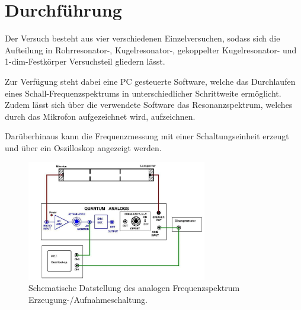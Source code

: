 \newpage
\section{Durchführung}
Der Versuch besteht aus vier verschiedenen Einzelversuchen, sodass sich die Aufteilung
in Rohrresonator-, Kugelresonator-, gekoppelter Kugelresonator- und 1-dim-Festkörper Versuchsteil gliedern lässt.

Zur Verfügung steht dabei eine PC gesteuerte Software, welche das Durchlaufen eines Schall-Frequenzspektrums 
in unterschiedlicher Schrittweite ermöglicht. Zudem lässt sich über die verwendete Software das Resonanzspektrum, welches durch 
das Mikrofon aufgezeichnet wird, aufzeichnen.

Darüberhinaus kann die Frequenzmessung mit einer Schaltungseinheit
erzeugt und über ein Oszilloskop angezeigt werden.
\begin{figure}
    \center
    \includegraphics[width=0.7\textwidth]{bilder/anleitung.jpg}
    \caption{Schematische Datstellung des analogen Frequenzspektrum Erzeugung-/Aufnahmeschaltung.\cite{anleitung}}
\end{figure}

